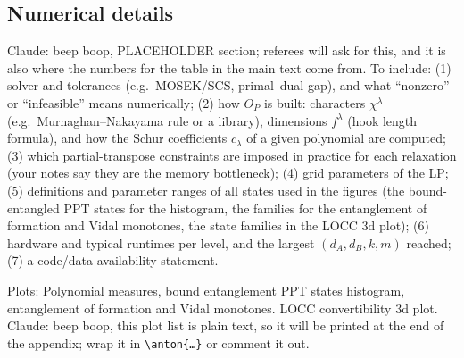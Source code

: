 \documentclass[aps,pra,twocolumn,showpacs,superscriptaddress,groupedaddress]{revtex4-2}
\newcommand{\claude}[1]{{\color{claudeorange} Claude: beep boop, #1}}
\begin{document}
\begin{widetext}
\section{Numerical details}\label{app:numerics}
\claude{PLACEHOLDER section; referees will ask for this, and it is also where the numbers for the table in the main text come from. To include: (1) solver and tolerances (e.g.\ MOSEK/SCS, primal--dual gap), and what ``nonzero'' or ``infeasible'' means numerically; (2) how $O_P$ is built: characters $\chi^\lambda$ (e.g.\ Murnaghan--Nakayama rule or a library), dimensions $f^\lambda$ (hook length formula), and how the Schur coefficients $c_\lambda$ of a given polynomial are computed; (3) which partial-transpose constraints are imposed in practice for each relaxation (your notes say they are the memory bottleneck); (4) grid parameters of the LP; (5) definitions and parameter ranges of all states used in the figures (the bound-entangled PPT states for the histogram, the families for the entanglement of formation and Vidal monotones, the state families in the LOCC 3d plot); (6) hardware and typical runtimes per level, and the largest $(d_A,d_B,k,m)$ reached; (7) a code/data availability statement.}

Plots: Polynomial measures, bound entanglement PPT states histogram, entanglement of formation and Vidal monotones. LOCC convertibility 3d plot.
\claude{this plot list is plain text, so it will be printed at the end of the appendix; wrap it in \texttt{\textbackslash anton\{\dots\}} or comment it out.}

\end{widetext}
\end{document}

